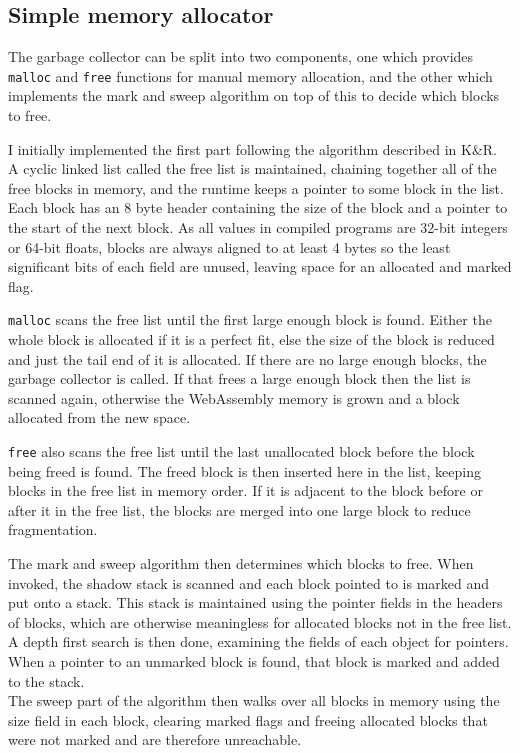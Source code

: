 \subsection{Simple memory allocator}
The garbage collector can be split into two components, one which provides \verb|malloc| and \verb|free| functions for manual memory allocation, and the other which implements the mark and sweep algorithm on top of this to decide which blocks to free. 

I initially implemented the first part following the algorithm described in K\&R\nocite{k_and_r}. A cyclic linked list called the free list is maintained, chaining together all of the free blocks in memory, and the runtime keeps a pointer to some block in the list. Each block has an 8 byte header containing the size of the block and a pointer to the start of the next block. %
As all values in compiled programs are 32-bit integers or 64-bit floats, blocks are always aligned to at least 4 bytes so the least significant bits of each field are unused, leaving space for an allocated and marked flag. 

\verb|malloc| scans the free list until the first large enough block is found. Either the whole block is allocated if it is a perfect fit, else the size of the block is reduced and just the tail end of it is allocated. If there are no large enough blocks, the garbage collector is called. If that frees a large enough block then the list is scanned again, otherwise the WebAssembly memory is grown and a block allocated from the new space.


\verb|free| also scans the free list until the last unallocated block before the block being freed is found. The freed block is then inserted here in the list, keeping blocks in the free list in memory order. If it is adjacent to the block before or after it in the free list, the blocks are merged into one large block to reduce fragmentation.

The mark and sweep algorithm then determines which blocks to free. When invoked, the shadow stack is scanned and each block pointed to is marked and put onto a stack. This stack is maintained using the pointer fields in the headers of blocks, which are otherwise meaningless for allocated blocks not in the free list. A depth first search is then done, examining the fields of each object for pointers. When a pointer to an unmarked block is found, that block is marked and added to the stack. \\
The sweep part of the algorithm then walks over all blocks in memory using the size field in each block, clearing marked flags and freeing allocated blocks that were not marked and are therefore unreachable.

